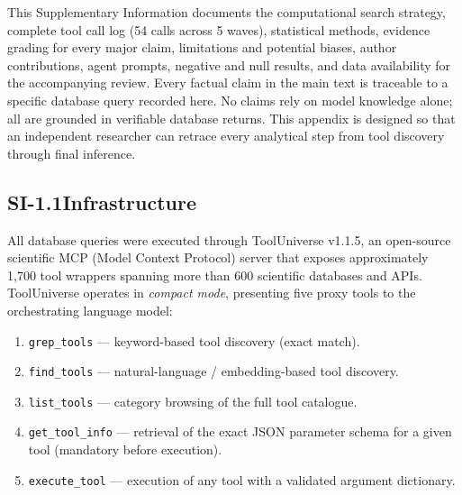 
\sloppy


\bigskip

This Supplementary Information documents the computational search strategy,
complete tool call log (54 calls across 5 waves), statistical methods,
evidence grading for every major claim, limitations and potential biases,
author contributions, agent prompts, negative and null results, and data
availability for the accompanying review.  Every factual claim in the main
text is traceable to a specific database query recorded here.  No claims
rely on model knowledge alone; all are grounded in verifiable database
returns.  This appendix is designed so that an independent researcher can
retrace every analytical step from tool discovery through final inference.


\subsection*{SI-1.1\quad Infrastructure}

All database queries were executed through ToolUniverse v1.1.5, an open-source
scientific MCP (Model Context Protocol) server that exposes approximately
1,700 tool wrappers spanning more than 600 scientific databases and APIs.
ToolUniverse operates in \emph{compact mode}, presenting five proxy tools to
the orchestrating language model:

\begin{enumerate}[nosep]
  \item \texttt{grep\_tools} --- keyword-based tool discovery (exact match).
  \item \texttt{find\_tools} --- natural-language / embedding-based tool
        discovery.
  \item \texttt{list\_tools} --- category browsing of the full tool catalogue.
  \item \texttt{get\_tool\_info} --- retrieval of the exact JSON parameter
        schema for a given tool (mandatory before execution).
  \item \texttt{execute\_tool} --- execution of any tool with a validated
        argument dictionary.
\end{enumerate}

